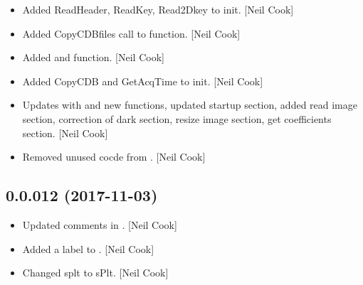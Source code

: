 \documentclass[a4paper,10pt,english]{report}
\begin{document}
\begin{itemize}
\item {} 
Added ReadHeader, ReadKey, Read2Dkey to init. {[}Neil Cook{]}

\item {} 
Added CopyCDBfiles call to  function. {[}Neil Cook{]}

\item {} 
Added  and  function. {[}Neil Cook{]}

\item {} 
Added CopyCDB and GetAcqTime to init. {[}Neil Cook{]}

\item {} 
Updates  with  and new functions, updated startup
section, added read image section, correction of dark section, resize
image section, get coefficients section. {[}Neil Cook{]}

\item {} 
Removed unused cocde from . {[}Neil Cook{]}

\end{itemize}


\subsection{0.0.012 (2017-11-03)}
\label{\detokenize{misc/changelog:id538}}\begin{itemize}
\item {} 
Updated comments in . {[}Neil Cook{]}

\item {} 
Added a label to . {[}Neil Cook{]}

\item {} 
Changed splt to sPlt. {[}Neil Cook{]}

\end{itemize}
\end{document}
